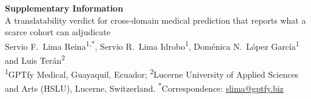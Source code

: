 \documentclass[12pt,a4paper]{article}
\newif\ifanon
\begin{document}
\thispagestyle{fancy}

\begin{center}
{\Large\bfseries Supplementary Information}\\[2ex]
{\large A translatability verdict for cross-domain medical prediction that
reports what a scarce cohort can adjudicate}\\[2ex]
\ifanon
Authors withheld for double-anonymised peer review\\[2ex]
\else
Servio F.~Lima Reina\textsuperscript{1,*}, Servio R.~Lima
Idrobo\textsuperscript{1}, Dom\'enica N.~L\'opez Garc\'ia\textsuperscript{1}
and Luis Ter\'an\textsuperscript{2}\\[1ex]
{\small \textsuperscript{1}GPTfy Medical, Guayaquil, Ecuador;
\textsuperscript{2}Lucerne University of Applied Sciences and Arts (HSLU),
Lucerne, Switzerland.
\textsuperscript{*}Correspondence: \href{mailto:slima@gptfy.biz}{slima@gptfy.biz}}\\[2ex]
\fi
\end{center}



\clearpage
\renewcommand{\refname}{Supplementary References}


\end{document}
